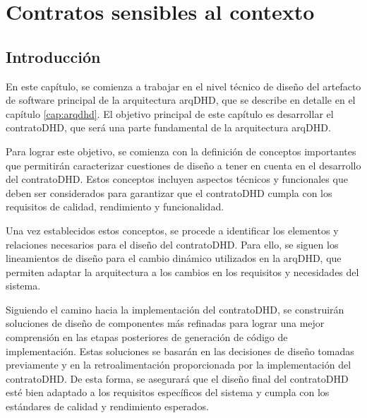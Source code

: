 \parskip=1cm

\chapter{Contratos sensibles al contexto}\label{cap:contratos} \label{cap:5}


\lstset{style=mystyle}

\section {Introducción}\label{sec:Introducción}


En este capítulo, se comienza a trabajar en el nivel técnico de diseño del artefacto de software principal de la arquitectura arqDHD, que se describe en detalle en el capítulo \ref{cap:arqdhd}. El objetivo principal de este capítulo es desarrollar el contratoDHD, que será una parte fundamental de la arquitectura arqDHD.

Para lograr este objetivo, se comienza con la definición de conceptos importantes que permitirán caracterizar cuestiones de diseño a tener en cuenta en el desarrollo del contratoDHD. Estos conceptos incluyen aspectos técnicos y funcionales que deben ser considerados para garantizar que el contratoDHD cumpla con los requisitos de calidad, rendimiento y funcionalidad.

Una vez establecidos estos conceptos, se procede a identificar los elementos y relaciones necesarios para el diseño del contratoDHD. Para ello, se siguen los lineamientos de diseño para el cambio dinámico utilizados en la arqDHD, que permiten adaptar la arquitectura a los cambios en los requisitos y necesidades del sistema.

Siguiendo el camino hacia la implementación del contratoDHD, se construirán soluciones de diseño de componentes más refinadas para lograr una mejor comprensión en las etapas posteriores de generación de código de implementación. Estas soluciones se basarán en las decisiones de diseño tomadas previamente y en la retroalimentación proporcionada por la implementación del contratoDHD. De esta forma, se asegurará que el diseño final del contratoDHD esté bien adaptado a los requisitos específicos del sistema y cumpla con los estándares de calidad y rendimiento esperados.


